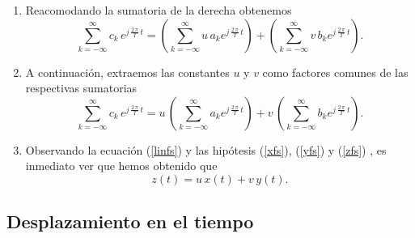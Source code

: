 \begin{enumerate}
\item Reacomodando la sumatoria de la derecha obtenemos
\begin{equation}
  \sum_{k=-\infty}^{\infty}  c_{k} \, e^{j \, \frac{2 \, \pi}{T} \, t} = 
    \left( \sum_{k=-\infty}^{\infty} u \, a_{k} e^{j \, \frac{2 \, \pi}{T} \,
        t} \right) + 
    \left( \sum_{k=-\infty}^{\infty} v \, b_{k} e^{j \, \frac{2 \, \pi}{T} \,
        t} \right). 
\end{equation}

\item A continuaci\'{o}n, extraemos las constantes $u$ y $v$ como
  factores comunes de las respectivas sumatorias
\begin{equation}
  \sum_{k=-\infty}^{\infty}  c_{k} \, e^{j \, \frac{2 \, \pi}{T} \, t} = 
    u \, \left( \sum_{k=-\infty}^{\infty} a_{k} e^{j \, \frac{2 \, \pi}{T} \, t} \right) + 
    v \, \left( \sum_{k=-\infty}^{\infty} b_{k} e^{j \, \frac{2 \, \pi}{T} \, t} \right). \label{linfs}
\end{equation}

\item Observando la ecuaci\'{o}n (\ref{linfs}) y las hip\'{o}tesis
  (\ref{xfs}), (\ref{yfs}) y (\ref{zfs}) , es inmediato ver que hemos
  obtenido que 
\begin{equation}
z(t) = u \, x(t) + v \, y(t).
\end{equation}

\end{enumerate}

\subsection{Desplazamiento en el tiempo}

